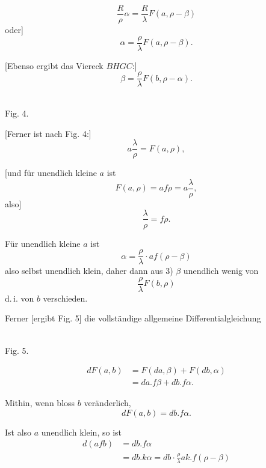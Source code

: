%
\[
\frac{R}{\rho}\alpha = \frac{R}{\lambda} F(a, \rho-\beta)
\]
oder]
\[
\tag*{2)} \alpha = \frac{\rho}{\lambda} F(a, \rho-\beta).
\]

[Ebenso ergibt das Viereck $BHGC$:]
\[
\tag*{3)} \beta = \frac{\rho}{\lambda} F(b, \rho-\alpha).
\]

\begin{center}\begin{minipage}{\linewidth}\centering\\[3pt]Fig. 4.\end{minipage}\end{center}

[Ferner ist nach Fig. 4:]
\[
\tag*{4)} a\frac{\lambda}{\rho} = F(a, \rho),
\]

[und für unendlich kleine $a$ ist
\[
F(a,\rho) = af\rho = a\frac{\lambda}{\rho},
\]
also]
\[
\tag*{5)} \frac{\lambda}{\rho} = f\rho.
\]

Für unendlich kleine $a$ ist
\[
\alpha = \frac{\rho}{\lambda}\cdot af(\rho-\beta)
\]
also selbst unendlich klein, daher dann aus 3) $\beta$ unendlich wenig von
\[
\frac{\rho}{\lambda} F(b,\rho)
\]
d.\,i. von $b$ verschieden.

Ferner [ergibt Fig. 5] die vollständige allgemeine Differentialgleichung

\begin{center}\begin{minipage}{\linewidth}\centering\\[3pt]Fig. 5.\end{minipage}\end{center}

\[
\tag*{6)} \begin{aligned}dF(a,b) &= F(da,\beta) + F(db,\alpha)\\ &= da.f\beta + db.f\alpha.\end{aligned}
\]

Mithin, wenn bloss $b$ veränderlich,
\[
dF(a,b) = db.f\alpha.
\]

Ist also $a$ unendlich klein, so ist
\[
\begin{aligned}d(afb) &= db.f\alpha\\ &= db.k\alpha = db\cdot\frac{\rho}{\lambda}ak.f(\rho-\beta)\end{aligned}
\]
